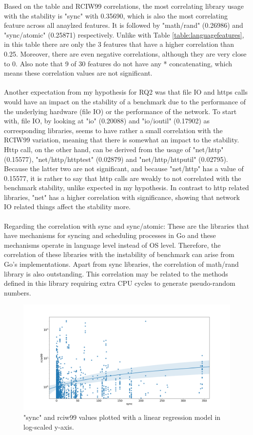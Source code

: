 \documentclass{seal_thesis}
\begin{document}
\noindent Based on the table and RCIW99 correlations, the most correlating library usage with the stability is "sync" with 0.35690, which is also the most correlating feature across all anaylzed features. It is followed by "math/rand" (0.26986) and "sync/atomic" (0.25871) respectively. Unlike with Table \ref{table:languagefeatures}, in this table there are only the 3 features that have a higher correlation than 0.25. Moreover, there are even negative correlations, although they are very close to 0. Also note that 9 of 30 features do not have any * concatenating, which means these correlation values are not significant.\\
\\
Another expectation from my hypothesis for RQ2 was that file IO and https calls would have an impact on the stability of a benchmark due to the performance of the underlying hardware (file IO) or the performance of the network. To start with, file IO, by looking at "io" (0.20088) and "io/ioutil" (0.17902) as corresponding libraries, seems to have rather a small correlation with the RCIW99 variation, meaning that there is somewhat an impact to the stability. Http call, on the other hand, can be derived from the usage of "net/http" (0.15577), "net/http/httptest" (0.02879) and "net/http/httputil" (0.02795). Because the latter two are not significant, and because "net/http" has a value of 0.15577, it is rather to say that http calls are weakly to not correlated with the benchmark stability, unlike expected in my hypothesis. In contrast to http related libraries, "net" has a higher correlation with significance, showing that network IO related things affect the stability more.\\
\\
Regarding the correlation with sync and sync/atomic: These are the libraries that have mechanisms for syncing and scheduling processes in Go and these mechanisms operate in language level instead of OS level. Therefore, the  correlation of these libraries with the instability of benchmark can arise from Go's implementations. Apart from sync libraries, the correlation of math/rand library is also outstanding. This correlation may be related to the methods defined in this library requiring extra CPU cycles to generate pseudo-random numbers.


\begin{figure}[H]
	\centering
	\includegraphics[width=\textwidth]{syncregression}
	\caption{"sync" and rciw99 values plotted with a linear regression model in log-scaled y-axis.}
	\label{fig:syncregression}
\end{figure}
\end{document}
